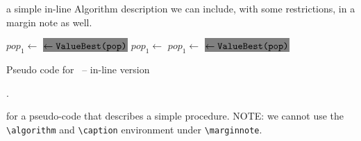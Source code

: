  a simple in-line Algorithm description we can include, with some restrictions, in a margin note as well.
\begin{algorithm}
\begin{algorithmic}[1]
\STATE $pop_1\gets$ 
\STATE {}
\STATE \colorbox{Gray} { $\gets \texttt{{ValueBest}(pop)}$}
        \STATE $\mathit{pop_1} \gets $
        \STATE $\mathit{pop_1} \gets $
        \STATE {}
        \STATE \colorbox{Gray}{ $\gets \texttt{{ValueBest}(pop)}$}
\ENDWHILE
\ENDPROCEDURE 
\end{algorithmic}
\caption{Pseudo code for \lssRRts\ -- in-line version}.
\end{algorithm}

 for a 
pseudo-code that describes a simple procedure. NOTE: we cannot use the \verb+\algorithm+ and \verb+\caption+ environment 
under  \verb+\marginnote+.

\lipsum[4]


 